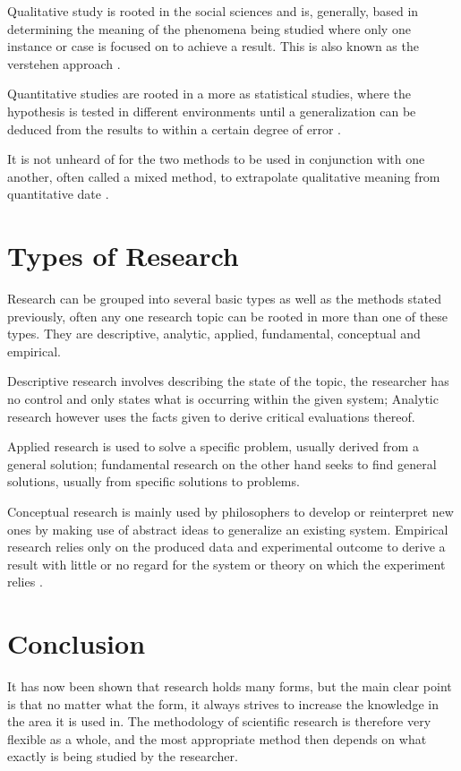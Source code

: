 \documentclass[paper=a4, fontsize=11pt]{scrartcl} %
\begin{document}
Qualitative study is rooted in the social sciences and is, generally, based in determining the meaning of the phenomena being studied where only one instance or case is focused on to achieve a result. This is also known as the verstehen approach \cite{newman1998qualitative}.

Quantitative studies are rooted in a more as statistical studies, where the hypothesis is tested in different environments until a generalization can be deduced from the results to within a certain degree of error \cite{kleinbaum1982epidemiologic}.

It is not unheard of for the two methods to be used in conjunction with one another, often called a mixed method, to extrapolate qualitative meaning from quantitative date \cite{creswell2013research}.

\section{Types of Research}

Research can be grouped into several basic types as well as the methods stated previously, often any one research topic can be rooted in more than one of these types. They are descriptive, analytic, applied, fundamental, conceptual and empirical.

Descriptive research involves describing the state of the topic, the researcher has no control and only states what is occurring within the given system; Analytic research however uses the facts given to derive critical evaluations thereof.

Applied research is used to solve a specific problem, usually derived from a general solution; fundamental research on the other hand seeks to find general solutions, usually from specific solutions to problems.

Conceptual research is mainly used by philosophers to develop or reinterpret new ones by making use of abstract ideas to generalize an existing system. Empirical research relies only on the produced data and experimental outcome to derive a result with little or no regard for the system or theory on which the experiment relies \cite{kothari2004research}.

\section{Conclusion}

It has now been shown that research holds many forms, but the main clear point is that no matter what the form, it always strives to increase the knowledge in the area it is used in. The methodology of scientific research is therefore very flexible as a whole, and the most appropriate method then depends on what exactly is being studied by the researcher.

\pagebreak





\end{document}
